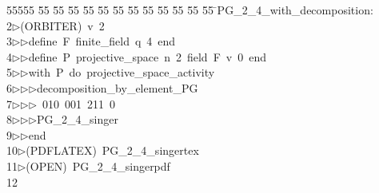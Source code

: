 %
%
\begin{tabbing}
55555 \= 55 \= 55 \= 55 \= 55 \= 55 \= 55 \= 55 \= 55 \= 55 \= 55 \= 55 \= 55 \= \>PG\_2\_4\_with\_decomposition:\\[0pt]
2\>$\triangleright$\>(ORBITER)\ v\ 2\ \\[0pt]
3\>$\triangleright$\>$\triangleright$\>define\ F\ finite\_field\ q\ 4\ end\ \\[0pt]
4\>$\triangleright$\>$\triangleright$\>define\ P\ projective\_space\ n\ 2\ field\ F\ v\ 0\ end\ \\[0pt]
5\>$\triangleright$\>$\triangleright$\>with\ P\ do\ projective\_space\_activity\ \\[0pt]
6\>$\triangleright$\>$\triangleright$\>$\triangleright$\>decomposition\_by\_element\_PG\ \\[0pt]
7\>$\triangleright$\>$\triangleright$\>$\triangleright$\ 010\ 001\ 211\ 0\ \\[0pt]
8\>$\triangleright$\>$\triangleright$\>$\triangleright$\>PG\_2\_4\_singer\ \\[0pt]
9\>$\triangleright$\>$\triangleright$\>end\\[0pt]
10\>$\triangleright$\>(PDFLATEX)\ PG\_2\_4\_singertex\\[0pt]
11\>$\triangleright$\>(OPEN)\ PG\_2\_4\_singerpdf\\[0pt]
12\>\end{tabbing}
